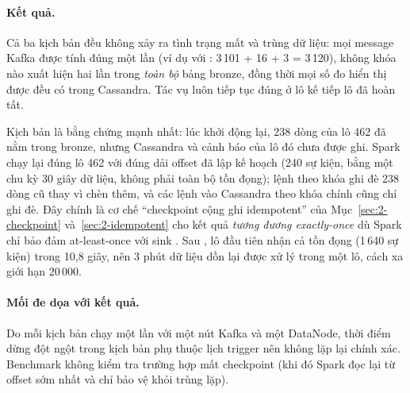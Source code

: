\paragraph{Kết quả.} Cả ba kịch bản đều không xảy ra tình trạng mất và trùng dữ liệu: mọi message Kafka được tính đúng một lần (ví dụ với : 3\,101 + 16 + 3 = 3\,120), không khóa nào xuất hiện hai lần trong \emph{toàn bộ} bảng bronze, đồng thời mọi số đo hiển thị được đều có trong Cassandra. Tác vụ luôn tiếp tục đúng ở lô kế tiếp lô đã hoàn tất.

Kịch bản  là bằng chứng mạnh nhất: lúc khởi động lại, 238 dòng của lô 462 đã nằm trong bronze, nhưng Cassandra và cảnh báo của lô đó chưa được ghi. Spark chạy lại đúng lô 462 với đúng dải offset đã lập kế hoạch (240 sự kiện, bằng một chu kỳ 30 giây dữ liệu, không phải toàn bộ tồn đọng); lệnh  theo khóa  ghi đè 238 dòng cũ thay vì chèn thêm, và các lệnh  vào Cassandra theo khóa chính cũng chỉ ghi đè. Đây chính là cơ chế ``checkpoint cộng ghi idempotent'' của Mục~\ref{sec:2-checkpoint} và~\ref{sec:2-idempotent} cho kết quả \emph{tương đương exactly-once} dù Spark chỉ bảo đảm at-least-once với sink . Sau , lô đầu tiên nhận cả tồn đọng (1\,640 sự kiện) trong 10,8 giây, nên 3 phút dữ liệu dồn lại được xử lý trong một lô, cách xa giới hạn  20\,000.

\paragraph{Mối đe dọa với kết quả.} Do mỗi kịch bản chạy một lần với một nút Kafka và một DataNode, thời điểm dừng đột ngột trong kịch bản  phụ thuộc lịch trigger nên không lặp lại chính xác. Benchmark không kiểm tra trường hợp mất checkpoint (khi đó Spark đọc lại từ offset sớm nhất và chỉ  bảo vệ khỏi trùng lặp).

